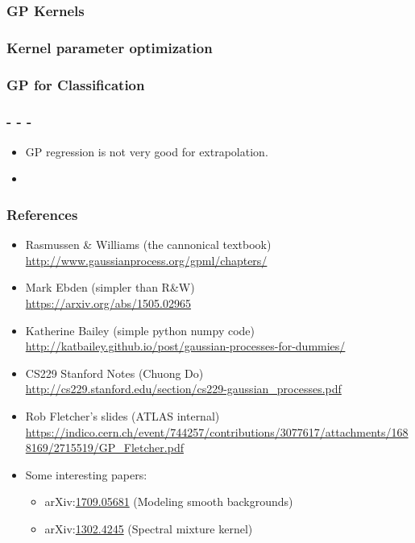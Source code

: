 \begin{frame} \frametitle{GP Kernels}
\end{frame}

\begin{frame} \frametitle{Kernel parameter optimization}
\end{frame}

\begin{frame} \frametitle{GP for Classification}
\end{frame}

\begin{frame} \frametitle{- - -}
\begin{itemize}
  \item GP regression is not very good for extrapolation.
  \item {}
\end{itemize}
\end{frame}

\newcommand{\R}[2]{\item #1 \\ {\scriptsize\url{#2}}}
\newcommand{\arxiv}[1]{arXiv:\href{https://arxiv.org/abs/#1}{#1}}

\begin{frame} \frametitle{References}
\begin{itemize}
  \R{Rasmussen \& Williams (the cannonical textbook)}
    {http://www.gaussianprocess.org/gpml/chapters/}
  \R{Mark Ebden {\small(simpler than R\&W)}}
    {https://arxiv.org/abs/1505.02965}
  \R{Katherine Bailey {\small(simple python\,\plus\,numpy code)}}
    {http://katbailey.github.io/post/gaussian-processes-for-dummies/}
  \R{CS229 Stanford Notes (Chuong Do)}
    {http://cs229.stanford.edu/section/cs229-gaussian_processes.pdf}
  \R{Rob Fletcher's slides (ATLAS internal)}
    {https://indico.cern.ch/event/744257/contributions/3077617/attachments/1688169/2715519/GP_Fletcher.pdf}
  \item Some interesting papers:
  \begin{itemize}
    \item \arxiv{1709.05681} (Modeling smooth backgrounds)
    \item \arxiv{1302.4245} (Spectral mixture kernel)
  \end{itemize}
\end{itemize}
\end{frame}

